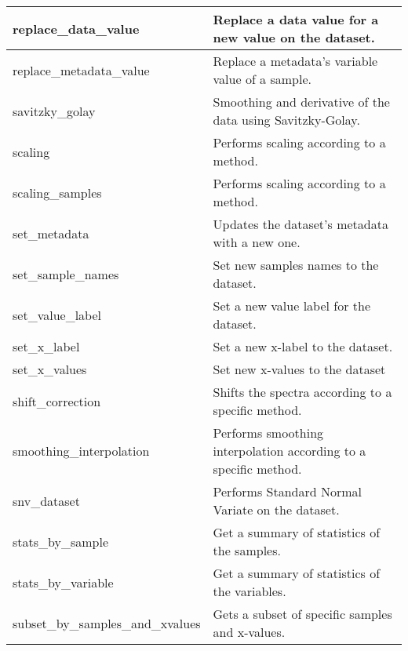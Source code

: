\begin{scriptsize}
\begin{longtable}{|m{4.3cm}|m{11cm}|}
		\hline
		replace\_data\_value & Replace a data value for a new value on the dataset. \\
		
		\hline
		replace\_metadata\_value & Replace a metadata’s variable value of a sample. \\
		
		\hline
		savitzky\_golay & Smoothing and derivative of the data using Savitzky-Golay. \\
		
		\hline
		scaling & Performs scaling according to a method. \\
		
		\hline
		scaling\_samples & Performs scaling according to a method. \\
		
		\hline
		set\_metadata & Updates the dataset’s metadata with a new one. \\
		
		\hline
		set\_sample\_names & Set new samples names to the dataset. \\
		
		\hline
		set\_value\_label & Set a new value label for the dataset. \\
		
		\hline
		set\_x\_label & Set a new x-label to the dataset. \\
		
		\hline
		set\_x\_values & Set new x-values to the dataset \\
		
		\hline
		shift\_correction & Shifts the spectra according to a specific method. \\
		
		\hline
		smoothing\_interpolation & Performs smoothing interpolation according to a specific method. \\
		
		\hline
		snv\_dataset & Performs Standard Normal Variate on the dataset. \\
		
		\hline
		stats\_by\_sample & Get a summary of statistics of the samples. \\
		
		\hline
		stats\_by\_variable & Get a summary of statistics of the variables. \\
		
		\hline
		subset\_by\_samples\_and\_xvalues & Gets a subset of specific samples and x-values. \\
		

\end{longtable}
\end{scriptsize}
